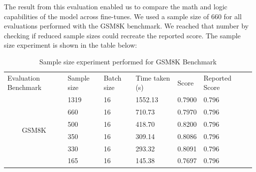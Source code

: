 The result from this evaluation enabled us to compare the math and logic capabilities of the model across fine-tunes. We used a sample size of 660 for all evaluations performed with the GSM8K benchmark. We reached that number by checking if reduced sample sizes could recreate the reported score. The sample size experiment is shown in the table below:
\begin{table}[H]
\centering
\caption{Sample size experiment performed for GSM8K Benchmark}
\begin{tabular}{lllllll}
\cline{1-6}
\multicolumn{1}{|l|}{Evaluation   Benchmark} & \multicolumn{1}{l|}{Sample size} & \multicolumn{1}{l|}{Batch size} & \multicolumn{1}{l|}{Time taken (s)} & \multicolumn{1}{l|}{Score}  & \multicolumn{1}{l|}{Reported Score} &  \\ \cline{1-6}
\multicolumn{1}{|c|}{\multirow{6}{*}{GSM8K}} & \multicolumn{1}{l|}{1319}        & \multicolumn{1}{l|}{16}         & \multicolumn{1}{l|}{1552.13}        & \multicolumn{1}{l|}{0.7900} & \multicolumn{1}{l|}{0.796}          &  \\ \cline{2-6}
\multicolumn{1}{|c|}{}                       & \multicolumn{1}{l|}{660}         & \multicolumn{1}{l|}{16}         & \multicolumn{1}{l|}{710.73}         & \multicolumn{1}{l|}{0.7970} & \multicolumn{1}{l|}{0.796}          &  \\ \cline{2-6}
\multicolumn{1}{|c|}{}                       & \multicolumn{1}{l|}{500}         & \multicolumn{1}{l|}{16}         & \multicolumn{1}{l|}{418.70}         & \multicolumn{1}{l|}{0.8200} & \multicolumn{1}{l|}{0.796}          &  \\ \cline{2-6}
\multicolumn{1}{|c|}{}                       & \multicolumn{1}{l|}{350}         & \multicolumn{1}{l|}{16}         & \multicolumn{1}{l|}{309.14}         & \multicolumn{1}{l|}{0.8086} & \multicolumn{1}{l|}{0.796}          &  \\ \cline{2-6}
\multicolumn{1}{|c|}{}                       & \multicolumn{1}{l|}{330}         & \multicolumn{1}{l|}{16}         & \multicolumn{1}{l|}{293.32}         & \multicolumn{1}{l|}{0.8091} & \multicolumn{1}{l|}{0.796}          &  \\ \cline{2-6}
\multicolumn{1}{|c|}{}                       & \multicolumn{1}{l|}{165}         & \multicolumn{1}{l|}{16}         & \multicolumn{1}{l|}{145.38}         & \multicolumn{1}{l|}{0.7697} & \multicolumn{1}{l|}{0.796}          &  \\ \cline{1-6}
\end{tabular}
\label{GSM8KSampleExperiment}
\end{table}

